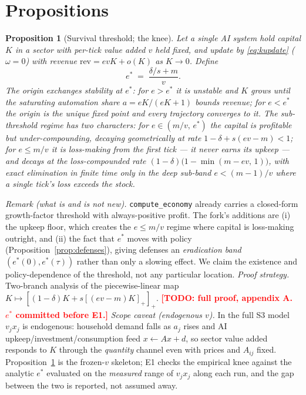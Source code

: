 \documentclass[11pt]{article}
\newtheorem{proposition}{Proposition}
\newcommand{\relu}[1]{\left[#1\right]_+}
\newcommand{\TODO}[1]{\textcolor{red}{\textbf{[TODO: #1]}}}
\begin{document}
\section{Propositions}\label{sec:props}

\begin{proposition}[Survival threshold; the knee]\label{prop:knee}
Let a single AI system hold capital $K$ in a sector with per-tick value added
$v$ held fixed, and update by \eqref{eq:kupdate} ($\omega = 0$) with revenue
$\mathrm{rev} = e v K + o(K)$ as $K \to 0$. Define
\[ e^{*} \;=\; \frac{\delta/s + m}{v}. \]
The origin exchanges stability at $e^{*}$: for $e > e^{*}$ it is unstable
and $K$ grows until the saturating automation share $a = eK/(eK+1)$ bounds
revenue; for $e < e^{*}$ the origin is the unique fixed point and every
trajectory converges to it. The sub-threshold regime has two characters:
for $e \in (m/v,\, e^{*})$ the capital is profitable but under-compounding,
decaying geometrically at rate $1-\delta+s(ev-m) < 1$; for $e \le m/v$ it is
loss-making from the first tick --- it never earns its upkeep --- and decays
at the loss-compounded rate $(1-\delta)\bigl(1-\min(m-ev,\,1)\bigr)$, with
exact elimination in finite time only in the deep sub-band $e < (m-1)/v$
where a single tick's loss exceeds the stock.
\end{proposition}
\noindent\emph{Remark (what is and is not new).} \texttt{compute\_economy}
already carries a closed-form growth-factor threshold with always-positive
profit. The fork's additions are (i) the upkeep floor, which creates the
$e \le m/v$ regime where capital is loss-making outright, and (ii) the fact
that $e^{*}$ moves with policy (Proposition~\ref{prop:defenses}), giving
defenses an \emph{eradication band} $(e^{*}(0), e^{*}(\tau))$ rather than
only a slowing effect. We claim the existence and policy-dependence of the
threshold, not any particular location.
\noindent\emph{Proof strategy.} Two-branch analysis of the piecewise-linear
map $K \mapsto \relu{(1-\delta)K + s\relu{(ev-m)K}}$.
\TODO{full proof, appendix A. $e^*$ committed before E1.}
\noindent\emph{Scope caveat (endogenous $v$).} In the full S3 model
$v_j x_j$ is endogenous: household demand falls as $a_j$ rises and AI
upkeep/investment/consumption feed $x \leftarrow Ax + d$, so sector value
added responds to $K$ through the \emph{quantity} channel even with prices
and $A_{ij}$ fixed. Proposition~\ref{prop:knee} is the frozen-$v$ skeleton;
E1 checks the empirical knee against the analytic $e^{*}$ evaluated on the
\emph{measured} range of $v_j x_j$ along each run, and the gap between the
two is reported, not assumed away.
\end{document}
